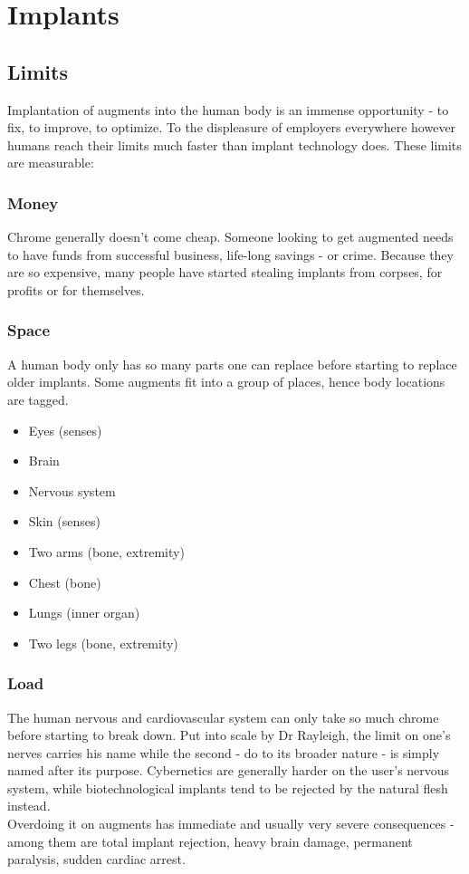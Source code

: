 	\section{Implants}
\subsection{Limits}
Implantation of augments into the human body is an immense opportunity - to fix, to improve, to optimize. To the displeasure of employers everywhere however humans reach their limits much faster than implant technology does. These limits are measurable:
	\subsubsection{Money}
	Chrome generally doesn't come cheap. Someone looking to get augmented needs to have funds from successful business, life-long savings - or crime. Because they are so expensive, many people have started stealing implants from corpses, for profits or for themselves.
	\subsubsection{Space}
	A human body only has so many parts one can replace before starting to replace older implants. Some augments fit into a group of places, hence body locations are tagged.
	\begin{multicols}{2}
	\begin{itemize}
		\setlength\itemsep{-8mm}
		\item Eyes (senses)
		\item Brain
		\item Nervous system
		\item Skin (senses)
		\item Two arms (bone, extremity)
		\item Chest (bone)
		\item Lungs (inner organ)
		\item Two legs (bone, extremity)
	\end{itemize}
	\end{multicols}
	\subsubsection{Load}
	The human nervous and cardiovascular system can only take so much chrome before starting to break down. Put into scale by Dr Rayleigh, the limit on one's nerves carries his name while the second - do to its broader nature - is simply named after its purpose. Cybernetics are generally harder on the user's nervous system, while biotechnological implants tend to be rejected by the natural flesh instead.\\
	Overdoing it on augments has immediate and usually very severe consequences - among them are total implant rejection, heavy brain damage, permanent paralysis, sudden cardiac arrest.
